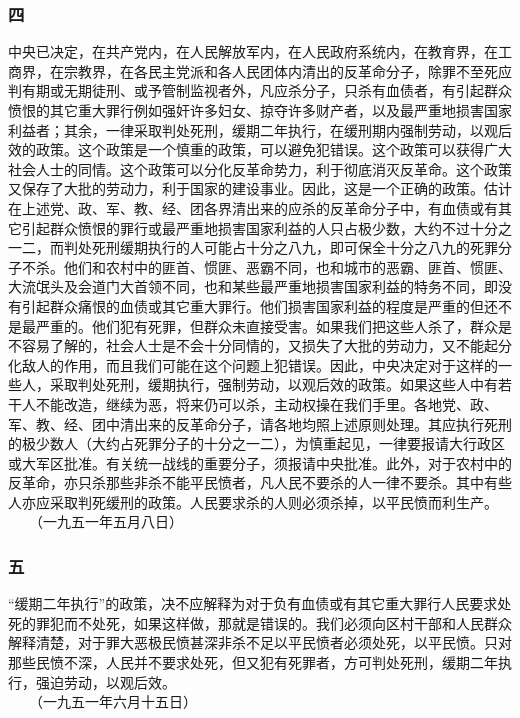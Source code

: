 \documentclass[cn,11pt,chinese]{elegantbook}
\def\myformat#1{\hfil\hfil #1}
\begin{document}
\subsubsection*{\myformat{四}}
中央已决定，在共产党内，在人民解放军内，在人民政府系统内，在教育界，在工商界，在宗教界，在各民主党派和各人民团体内清出的反革命分子，除罪不至死应判有期或无期徒刑、或予管制监视者外，凡应杀分子，只杀有血债者，有引起群众愤恨的其它重大罪行例如强奸许多妇女、掠夺许多财产者，以及最严重地损害国家利益者；其余，一律采取判处死刑，缓期二年执行，在缓刑期内强制劳动，以观后效的政策。这个政策是一个慎重的政策，可以避免犯错误。这个政策可以获得广大社会人士的同情。这个政策可以分化反革命势力，利于彻底消灭反革命。这个政策又保存了大批的劳动力，利于国家的建设事业。因此，这是一个正确的政策。估计在上述党、政、军、教、经、团各界清出来的应杀的反革命分子中，有血债或有其它引起群众愤恨的罪行或最严重地损害国家利益的人只占极少数，大约不过十分之一二，而判处死刑缓期执行的人可能占十分之八九，即可保全十分之八九的死罪分子不杀。他们和农村中的匪首、惯匪、恶霸不同，也和城市的恶霸、匪首、惯匪、大流氓头及会道门大首领不同，也和某些最严重地损害国家利益的特务不同，即没有引起群众痛恨的血债或其它重大罪行。他们损害国家利益的程度是严重的但还不是最严重的。他们犯有死罪，但群众未直接受害。如果我们把这些人杀了，群众是不容易了解的，社会人士是不会十分同情的，又损失了大批的劳动力，又不能起分化敌人的作用，而且我们可能在这个问题上犯错误。因此，中央决定对于这样的一些人，采取判处死刑，缓期执行，强制劳动，以观后效的政策。如果这些人中有若干人不能改造，继续为恶，将来仍可以杀，主动权操在我们手里。各地党、政、军、教、经、团中清出来的反革命分子，请各地均照上述原则处理。其应执行死刑的极少数人（大约占死罪分子的十分之一二），为慎重起见，一律要报请大行政区或大军区批准。有关统一战线的重要分子，须报请中央批准。此外，对于农村中的反革命，亦只杀那些非杀不能平民愤者，凡人民不要杀的人一律不要杀。其中有些人亦应采取判死缓刑的政策。人民要求杀的人则必须杀掉，以平民愤而利生产。\\
　　（一九五一年五月八日）\\
\subsubsection*{\myformat{五}}
“缓期二年执行”的政策，决不应解释为对于负有血债或有其它重大罪行人民要求处死的罪犯而不处死，如果这样做，那就是错误的。我们必须向区村干部和人民群众解释清楚，对于罪大恶极民愤甚深非杀不足以平民愤者必须处死，以平民愤。只对那些民愤不深，人民并不要求处死，但又犯有死罪者，方可判处死刑，缓期二年执行，强迫劳动，以观后效。\\
　　（一九五一年六月十五日）\\
\end{document}
